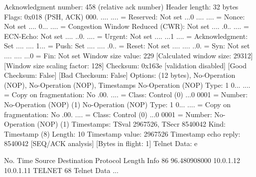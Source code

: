    Acknowledgment number: 458    (relative ack number)
    Header length: 32 bytes
    Flags: 0x018 (PSH, ACK)
        000. .... .... = Reserved: Not set
        ...0 .... .... = Nonce: Not set
        .... 0... .... = Congestion Window Reduced (CWR): Not set
        .... .0.. .... = ECN-Echo: Not set
        .... ..0. .... = Urgent: Not set
        .... ...1 .... = Acknowledgment: Set
        .... .... 1... = Push: Set
        .... .... .0.. = Reset: Not set
        .... .... ..0. = Syn: Not set
        .... .... ...0 = Fin: Not set
    Window size value: 229
    [Calculated window size: 29312]
    [Window size scaling factor: 128]
    Checksum: 0x163e [validation disabled]
        [Good Checksum: False]
        [Bad Checksum: False]
    Options: (12 bytes), No-Operation (NOP), No-Operation (NOP), Timestamps
        No-Operation (NOP)
            Type: 1
                0... .... = Copy on fragmentation: No
                .00. .... = Class: Control (0)
                ...0 0001 = Number: No-Operation (NOP) (1)
        No-Operation (NOP)
            Type: 1
                0... .... = Copy on fragmentation: No
                .00. .... = Class: Control (0)
                ...0 0001 = Number: No-Operation (NOP) (1)
        Timestamps: TSval 2967526, TSecr 8540042
            Kind: Timestamp (8)
            Length: 10
            Timestamp value: 2967526
            Timestamp echo reply: 8540042
    [SEQ/ACK analysis]
        [Bytes in flight: 1]
Telnet
    Data: e

No.     Time           Source                Destination           Protocol Length Info
     86 96.480908000   10.0.1.12             10.0.1.11             TELNET   68     Telnet Data ...


